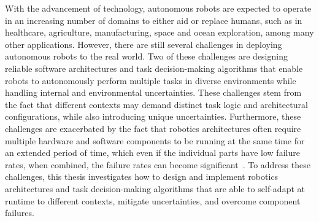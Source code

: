 With the advancement of technology, autonomous robots are expected to operate in an increasing number of domains to either aid or replace humans, such as in healthcare, agriculture, manufacturing, space and ocean exploration, among many other applications. However, there are still several challenges in deploying autonomous robots to the real world. Two of these challenges are designing reliable software architectures and task decision-making algorithms that enable robots to autonomously perform multiple tasks in diverse environments while handling internal and environmental uncertainties. These challenges stem from the fact that different contexts may demand distinct task logic and architectural configurations, while also introducing unique uncertainties. Furthermore, these challenges are exacerbated by the fact that robotics architectures often require multiple hardware and software components to be running at the same time for an extended period of time, which even if the individual parts have low failure rates, when combined, the failure rates can become significant~\cite{bajracharya2023demonstrating}. To address these challenges, this thesis investigates how to design and implement robotics architectures and task decision-making algorithms that are able to self-adapt at runtime to different contexts, mitigate uncertainties, and overcome component failures.


